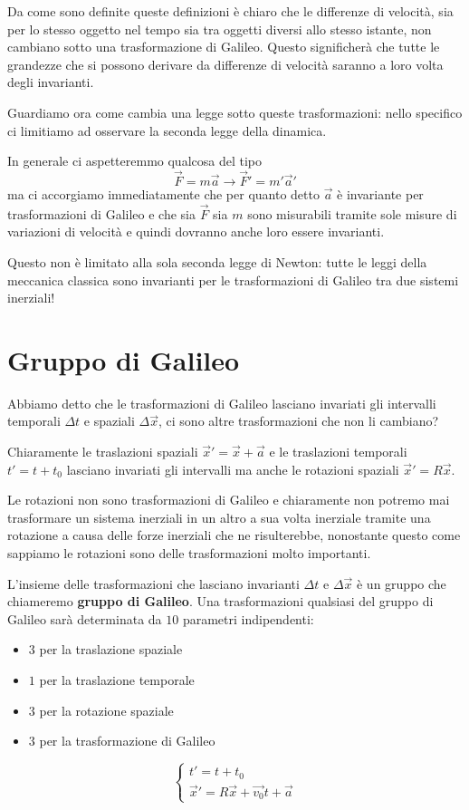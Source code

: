 \documentclass[12pt,a4paper,titlepage, twoside, openright]{book}
\numberwithin{equation}{chapter}
\begin{document}
Da come sono definite queste definizioni è chiaro che le differenze di velocità, sia per lo stesso oggetto nel tempo sia tra oggetti diversi allo stesso istante, non cambiano sotto una trasformazione di Galileo. 
Questo significherà che tutte le grandezze che si possono derivare da differenze di velocità saranno a loro volta degli invarianti.

Guardiamo ora come cambia una legge sotto queste trasformazioni: nello specifico ci limitiamo ad osservare la seconda legge della dinamica.

In generale ci aspetteremmo qualcosa del tipo
\[
\vec{F}=m\vec{a} \longrightarrow \vec{F}'=m'\vec{a}'
\]
ma ci accorgiamo immediatamente che per quanto detto $\vec{a}$ è invariante per trasformazioni di Galileo e che sia $\vec{F}$ sia $m$ sono misurabili tramite sole misure di variazioni di velocità e quindi dovranno anche loro essere invarianti.

Questo non è limitato alla sola seconda legge di Newton: tutte le leggi della meccanica classica sono invarianti per le trasformazioni di Galileo tra due sistemi inerziali!

\pagebreak

\section{Gruppo di Galileo}

Abbiamo detto che le trasformazioni di Galileo lasciano invariati gli intervalli temporali $\Delta t$ e spaziali $\Delta \vec{x}$, ci sono altre trasformazioni che non li cambiano?

Chiaramente le traslazioni spaziali $\vec{x}'=\vec{x}+\vec{a}$ e le traslazioni temporali $t'=t+t_0$ lasciano invariati gli intervalli ma anche le rotazioni spaziali $\vec{x}'=R\vec{x}$.

Le rotazioni non sono trasformazioni di Galileo e chiaramente non potremo mai trasformare un sistema inerziali in un altro a sua volta inerziale tramite una rotazione a causa delle forze inerziali che ne risulterebbe, nonostante questo come sappiamo le rotazioni sono delle trasformazioni molto importanti.

L'insieme delle trasformazioni che lasciano invarianti $\Delta t$ e $\Delta \vec{x}$ è un gruppo che chiameremo \textbf{gruppo di Galileo}. Una trasformazioni qualsiasi del gruppo di Galileo sarà determinata da $10$ parametri indipendenti:\begin{itemize}
\item $3$ per la traslazione spaziale
\item $1$ per la traslazione temporale
\item $3$ per la rotazione spaziale
\item $3$ per la trasformazione di Galileo
\end{itemize}
\[
\begin{cases}
t'=t+t_0 \\
\vec{x}'=R\vec{x}+\vec{v_0}t+\vec{a}
\end{cases}
\]
\end{document}
